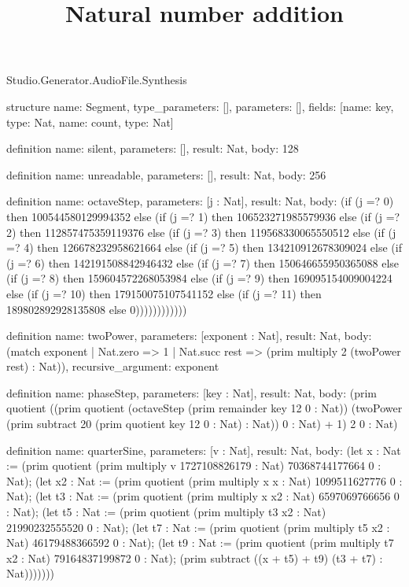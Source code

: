 \begin{lexlean}{Studio.Generator.AudioFile.Synthesis}
\title{Natural number addition}
\begin{semanticmodule}
structure{
  name: Segment,
  type_parameters: [],
  parameters: [],
  fields: [{name: key, type: Nat}, {name: count, type: Nat}]
}

definition{
  name: silent,
  parameters: [],
  result: Nat,
  body: 128
}

definition{
  name: unreadable,
  parameters: [],
  result: Nat,
  body: 256
}

definition{
  name: octaveStep,
  parameters: [j : Nat],
  result: Nat,
  body: (if (j =? 0) then 100544580129994352 else (if (j =? 1) then 106523271985579936 else (if (j =? 2) then 112857475359119376 else (if (j =? 3) then 119568330065550512 else (if (j =? 4) then 126678232958621664 else (if (j =? 5) then 134210912678309024 else (if (j =? 6) then 142191508842946432 else (if (j =? 7) then 150646655950365088 else (if (j =? 8) then 159604572268053984 else (if (j =? 9) then 169095154009004224 else (if (j =? 10) then 179150075107541152 else (if (j =? 11) then 189802892928135808 else 0))))))))))))
}

definition{
  name: twoPower,
  parameters: [exponent : Nat],
  result: Nat,
  body: (match exponent
    | Nat.zero => 1
    | Nat.succ rest => (prim multiply 2 (twoPower rest) : Nat)),
  recursive_argument: exponent
}

definition{
  name: phaseStep,
  parameters: [key : Nat],
  result: Nat,
  body: (prim quotient ((prim quotient (octaveStep (prim remainder key 12 0 : Nat)) (twoPower (prim subtract 20 (prim quotient key 12 0 : Nat) : Nat)) 0 : Nat) + 1) 2 0 : Nat)
}

definition{
  name: quarterSine,
  parameters: [v : Nat],
  result: Nat,
  body: (let x : Nat := (prim quotient (prim multiply v 1727108826179 : Nat) 70368744177664 0 : Nat); (let x2 : Nat := (prim quotient (prim multiply x x : Nat) 1099511627776 0 : Nat); (let t3 : Nat := (prim quotient (prim multiply x x2 : Nat) 6597069766656 0 : Nat); (let t5 : Nat := (prim quotient (prim multiply t3 x2 : Nat) 21990232555520 0 : Nat); (let t7 : Nat := (prim quotient (prim multiply t5 x2 : Nat) 46179488366592 0 : Nat); (let t9 : Nat := (prim quotient (prim multiply t7 x2 : Nat) 79164837199872 0 : Nat); (prim subtract ((x + t5) + t9) (t3 + t7) : Nat)))))))
}


\end{semanticmodule}
\end{lexlean}
